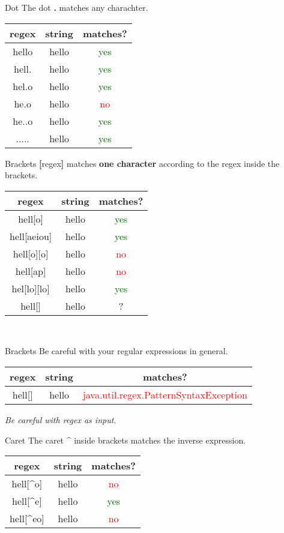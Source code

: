 \begin{frame}{Dot}
	The dot \textbf{.} matches any charachter.
	\vfill
	\begin{tabular}{ c c | c }
		regex & string & matches? \\
		\hline
		hello & hello & \textcolor{darkgreen}{yes} \\
		hell. & hello & \textcolor{darkgreen}{yes} \\
		hel.o & hello & \textcolor{darkgreen}{yes} \\
		he.o  & hello & \textcolor{red}{no} \\
		he..o & hello & \textcolor{darkgreen}{yes} \\
		..... & hello & \textcolor{darkgreen}{yes} 
	\end{tabular}
\end{frame}

\begin{frame}{Brackets}
	\textbf{[}regex\textbf{]} matches \textbf{one character} according to the regex inside the brackets.
	\vfill
	\begin{tabular}{ c c | c }
		regex & string & matches? \\
		\hline
		hell[o]     & hello & \textcolor{darkgreen}{yes} \\
		hell[aeiou] & hello & \textcolor{darkgreen}{yes} \\
		hell[o][o]  & hello & \textcolor{red}{no} \\
		hell[ap]    & hello & \textcolor{red}{no} \\
		hel[lo][lo] & hello & \textcolor{darkgreen}{yes} \\
		hell[] & hello & ?
	\end{tabular}\\
\end{frame}

\begin{frame}{Brackets}
	Be careful with your regular expressions in general.
	\vfill
	\begin{tabular}{ c c | c }
		regex & string & matches? \\
		\hline
		hell[] & hello & \textcolor{red}{java.util.regex.PatternSyntaxException}
	\end{tabular}
	\vfill
	\emph{Be careful with regex as input.}	
\end{frame}

\begin{frame}{Caret}
	The caret \textbf{\^{}} inside brackets matches the inverse expression.
	\vfill
	\begin{tabular}{ c c | c }
		regex & string & matches? \\
		\hline
		hell[\^{}o] & hello & \textcolor{red}{no} \\
		hell[\^{}e] & hello & \textcolor{darkgreen}{yes} \\
		hell[\^{}eo] & hello & \textcolor{red}{no}
	\end{tabular}
\end{frame}

